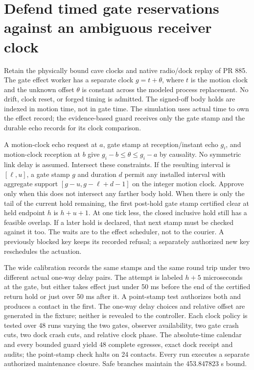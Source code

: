 \documentclass{article}
\begin{document}
\section*{Defend timed gate reservations against an ambiguous receiver clock}
Retain the physically bound cave clocks and native radio/dock replay
of PR 885. The gate effect worker has a separate clock $g=t+\theta$,
where $t$ is the motion clock and the unknown offset $\theta$ is
constant across the modeled process replacement. No drift, clock reset,
or forged timing is admitted. The signed-off body holds are indexed in
motion time, not in gate time. The simulation uses actual time to own
the effect record; the evidence-based guard receives only the gate stamp
and the durable echo records for its clock comparison.

A motion-clock echo request at $a$, gate stamp at reception/instant
echo $g_i$, and motion-clock reception at $b$ give
$g_i-b\le\theta\le g_i-a$ by causality. No symmetric link delay is
assumed. Intersect these constraints. If the resulting interval is
$[\ell,u]$, a gate stamp $g$ and duration $d$ permit any installed
interval with aggregate support $[g-u,g-\ell+d-1]$ on the integer
motion clock. Approve only when this does not intersect any farther
body hold. When there is only the tail of the current hold remaining,
the first post-hold gate stamp certified clear at held endpoint $h$
is $h+u+1$. At one tick less, the closed inclusive hold still has
a feasible overlap. If a later hold is declared, that next stamp
must be checked against it too. The waits are to the effect scheduler,
not to the courier. A previously blocked key keeps its recorded
refusal; a separately authorized new key reschedules the actuation.

The wide calibration records the same stamps and the same round trip
under two different actual one-way delay pairs. The attempt is
labeled $h+5$ microseconds at the gate, but either takes effect just
under 50 ms before the end of the certified return hold or just over
50 ms after it. A point-stamp test authorizes both and produces a
contact in the first. The one-way delay choices and relative offset are
generated in the fixture; neither is revealed to the controller.
Each clock policy is tested over 48 runs varying the two gates, observer
availability, two gate crash cuts, two dock crash cuts, and relative
clock phase. The absolute-time calendar and every bounded guard yield
48 complete egresses, exact dock receipt and audits; the point-stamp
check halts on 24 contacts. Every run executes a separate authorized
maintenance closure. Safe branches maintain the 453.847823 s bound.
\end{document}
